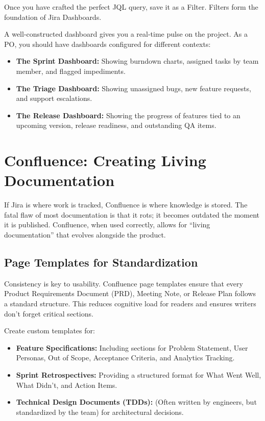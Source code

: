 \documentclass[
  11pt,
  openany,
  oneside]{book}
\providecommand{\tightlist}{%
  \setlength{\itemsep}{0pt}\setlength{\parskip}{0pt}}
\begin{document}
Once you have crafted the perfect JQL query, save it as a Filter.
Filters form the foundation of Jira Dashboards.

A well-constructed dashboard gives you a real-time pulse on the project.
As a PO, you should have dashboards configured for different contexts:

\begin{itemize}
\tightlist
\item
  \textbf{The Sprint Dashboard:} Showing burndown charts, assigned tasks
  by team member, and flagged impediments.
\item
  \textbf{The Triage Dashboard:} Showing unassigned bugs, new feature
  requests, and support escalations.
\item
  \textbf{The Release Dashboard:} Showing the progress of features tied
  to an upcoming version, release readiness, and outstanding QA items.
\end{itemize}

\section{Confluence: Creating Living
Documentation}\label{confluence-creating-living-documentation}

If Jira is where work is tracked, Confluence is where knowledge is
stored. The fatal flaw of most documentation is that it rots; it becomes
outdated the moment it is published. Confluence, when used correctly,
allows for ``living documentation'' that evolves alongside the product.

\subsection{Page Templates for
Standardization}\label{page-templates-for-standardization}

Consistency is key to usability. Confluence page templates ensure that
every Product Requirements Document (PRD), Meeting Note, or Release Plan
follows a standard structure. This reduces cognitive load for readers
and ensures writers don't forget critical sections.

Create custom templates for:

\begin{itemize}
\tightlist
\item
  \textbf{Feature Specifications:} Including sections for Problem
  Statement, User Personas, Out of Scope, Acceptance Criteria, and
  Analytics Tracking.
\item
  \textbf{Sprint Retrospectives:} Providing a structured format for What
  Went Well, What Didn't, and Action Items.
\item
  \textbf{Technical Design Documents (TDDs):} (Often written by
  engineers, but standardized by the team) for architectural decisions.
\end{itemize}
\end{document}
